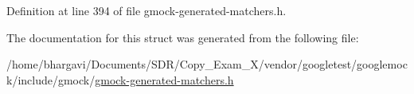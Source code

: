 Definition at line 394 of file gmock-\/generated-\/matchers.\+h.



The documentation for this struct was generated from the following file\+:\begin{DoxyCompactItemize}
\item 
/home/bhargavi/\+Documents/\+S\+D\+R/\+Copy\+\_\+\+Exam\+\_\+X/vendor/googletest/googlemock/include/gmock/\hyperlink{gmock-generated-matchers_8h}{gmock-\/generated-\/matchers.\+h}\end{DoxyCompactItemize}
